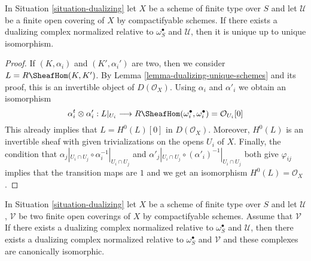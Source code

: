 \begin{lemma}
\label{lemma-good-dualizing-unique}
In Situation \ref{situation-dualizing} let $X$ be a scheme of finite type
over $S$ and let $\mathcal{U}$ be a finite open covering of $X$
by compactifyable schemes. If there exists a dualizing complex
normalized relative to $\omega_S^\bullet$ and $\mathcal{U}$, then it is unique
up to unique isomorphism.
\end{lemma}

\begin{proof}
If $(K, \alpha_i)$ and $(K', \alpha_i')$ are two, then we consider
$L = R\SheafHom(K, K')$. By Lemma \ref{lemma-dualizing-unique-schemes}
and its proof, this is an invertible object of $D(\mathcal{O}_X)$.
Using $\alpha_i$ and $\alpha'_i$ we obtain an isomorphism
$$
\alpha_i^t \otimes \alpha'_i :
L|_{U_i} \longrightarrow
R\SheafHom(\omega_i^\bullet, \omega_i^\bullet) = \mathcal{O}_{U_i}[0]
$$
This already implies that $L = H^0(L)[0]$ in $D(\mathcal{O}_X)$.
Moreover, $H^0(L)$ is an invertible sheaf with given trivializations
on the opens $U_i$ of $X$. Finally, the condition that
$\alpha_j|_{U_i \cap U_j} \circ \alpha_i^{-1}|_{U_i \cap U_j}$
and
$\alpha'_j|_{U_i \cap U_j} \circ (\alpha'_i)^{-1}|_{U_i \cap U_j}$
both give $\varphi_{ij}$ implies that the transition maps
are $1$ and we get an isomorphism $H^0(L) = \mathcal{O}_X$.
\end{proof}

\begin{lemma}
\label{lemma-good-dualizing-independence-covering}
In Situation \ref{situation-dualizing} let $X$ be a scheme of finite type
over $S$ and let $\mathcal{U}$, $\mathcal{V}$ be two finite open coverings
of $X$ by compactifyable schemes. Assume that $\mathcal{V}$
If there exists a dualizing complex normalized
relative to $\omega_S^\bullet$ and $\mathcal{U}$, then
there exists a dualizing complex normalized relative to
$\omega_S^\bullet$ and $\mathcal{V}$ and these complexes are
canonically isomorphic.
\end{lemma}

